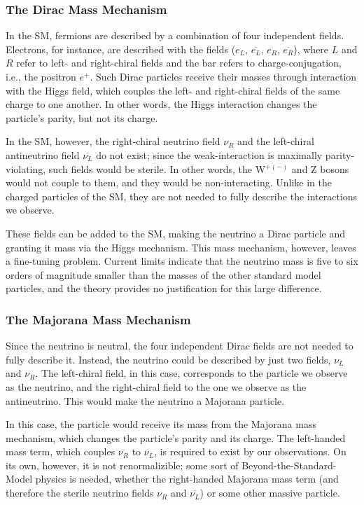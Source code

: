 \subsubsection{The Dirac Mass Mechanism}
In the SM, fermions are described by a combination of four independent fields. Electrons, for instance, are described with the fields ($e_L$, $\overline{e_L}$, $e_R$, $\overline{e_R}$), where $L$ and $R$ refer to left- and right-chiral fields and the bar refers to charge-conjugation, i.e., the positron $e^+$. Such Dirac particles receive their masses through interaction with the Higgs field, which couples the left- and right-chiral fields of the same charge to one another. In other words, the Higgs interaction changes the particle's parity, but not its charge. 

In the SM, however, the right-chiral neutrino field $\nu_R$ and the left-chiral antineutrino field $\overline{\nu_L}$ do not exist; since the weak-interaction is maximally parity-violating, such fields would be sterile. In other words, the W$^{+(-)}$ and Z bosons would not couple to them, and they would be non-interacting. Unlike in the charged particles of the SM, they are not needed to fully describe the interactions we observe.

These fields can be added to the SM, making the neutrino a Dirac particle and granting it mass via the Higgs mechanism. This mass mechanism, however, leaves a fine-tuning problem. Current limits indicate that the neutrino mass is five to six orders of magnitude smaller than the masses of the other standard model particles, and the theory provides no justification for this large difference. 

\subsubsection{The Majorana Mass Mechanism}
Since the neutrino is neutral, the four independent Dirac fields are not needed to fully describe it. Instead, the neutrino could be described by just two fields, $\nu_L$ and $\nu_R$. The left-chiral field, in this case, corresponds to the particle we observe as the neutrino, and the right-chiral field to the one we observe as the antineutrino. This would make the neutrino a Majorana particle.

In this case, the particle would receive its mass from the Majorana mass mechanism, which changes the particle's parity and its charge. The left-handed mass term, which couples $\overline{\nu_R}$ to $\nu_L$, is required to exist by our observations. On its own, however, it is not renormalizible; some sort of Beyond-the-Standard-Model physics is needed, whether the right-handed Majorana mass term (and therefore the sterile neutrino fields $\nu_R$ and $\overline{\nu_L}$) or some other massive particle.  

